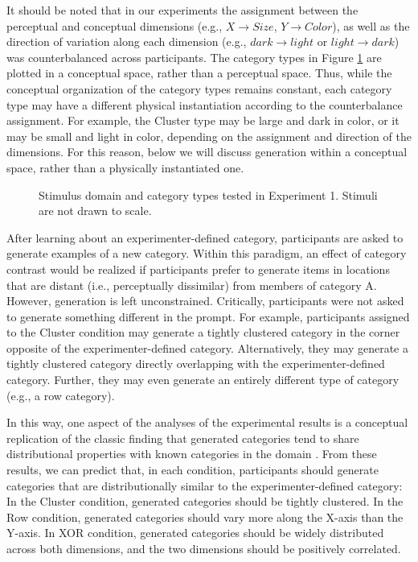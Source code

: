 \documentclass[12pt]{article}
\newcommand\inputpgf[2]{{
\let\pgfimageWithoutPath\pgfimage
\renewcommand{\pgfimage}[2][]{\pgfimageWithoutPath[##1]{#1/##2}}

}}
\begin{document}
\begin{flushleft}
It should be noted that in our experiments the assignment between the perceptual and conceptual dimensions (e.g., $X \rightarrow Size$, $Y \rightarrow Color$), as well as the direction of variation along each dimension (e.g., $dark \rightarrow light$ or $light \rightarrow dark$) was counterbalanced across participants. The category types in Figure \ref{fig:e1-conditions} are plotted in a conceptual space, rather than a perceptual space. Thus, while the conceptual organization of the category types remains constant, each category type may have a different physical instantiation according to the counterbalance assignment. For example, the Cluster type  may be large and dark in color, or it may be small and light in color, depending on the assignment and direction of the dimensions. For this reason, below we will discuss generation within a conceptual space, rather than a physically instantiated one.

\begin{figure}
    \begin{center}
    \inputpgf{figs/}{e1-conditions.pgf}
    \caption{Stimulus domain and category types tested in Experiment 1. Stimuli are not drawn to scale.}
    \label{fig:e1-conditions}
    \end{center}
\end{figure}

After learning about an experimenter-defined category, participants are asked to generate examples of a new category. Within this paradigm, an effect of category contrast would be realized if participants prefer to generate items in locations that are distant (i.e., perceptually dissimilar) from members of category A. However, generation is left unconstrained. Critically, participants were not asked to generate something different in the prompt. For example, participants assigned to the Cluster condition may generate a tightly clustered category in the corner opposite of the experimenter-defined category. Alternatively, they may generate a tightly clustered category directly overlapping with the experimenter-defined category. Further, they may even generate an entirely different type of category (e.g., a row category). 

In this way, one aspect of the analyses of the experimental results is a conceptual replication of the classic finding that generated categories tend to share distributional properties with known categories in the domain \citep[see][]{jern2013probabilistic,ward1994structured}. From these results, we can predict that, in each condition, participants should generate categories that are distributionally similar to the experimenter-defined category: In the Cluster condition, generated categories should be tightly clustered. In the Row condition, generated categories should vary more along the X-axis than the Y-axis. In XOR condition, generated categories should be widely distributed across both dimensions, and the two dimensions should be positively correlated. 


\end{flushleft}
\end{document}
